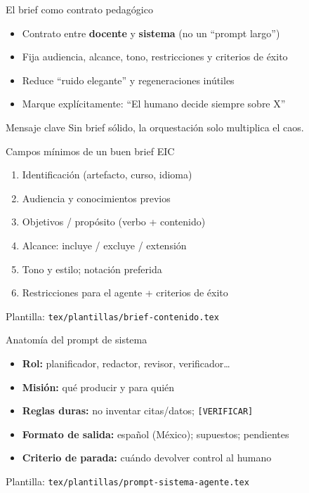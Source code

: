 \documentclass[aspectratio=169,11pt]{beamer}
\begin{document}
\begin{frame}{El brief como contrato pedagógico}
\begin{itemize}
\item Contrato entre \textbf{docente} y \textbf{sistema} (no un ``prompt largo'')
\item Fija audiencia, alcance, tono, restricciones y criterios de éxito
\item Reduce ``ruido elegante'' y regeneraciones inútiles
\item Marque explícitamente: ``El humano decide siempre sobre X''
\end{itemize}
\begin{alertblock}{Mensaje clave}
Sin brief sólido, la orquestación solo multiplica el caos.
\end{alertblock}
\end{frame}

\begin{frame}{Campos mínimos de un buen brief EIC}
\begin{enumerate}
\item Identificación (artefacto, curso, idioma)
\item Audiencia y conocimientos previos
\item Objetivos / propósito (verbo + contenido)
\item Alcance: incluye / excluye / extensión
\item Tono y estilo; notación preferida
\item Restricciones para el agente + criterios de éxito
\end{enumerate}
Plantilla: \texttt{tex/plantillas/brief-contenido.tex}
\end{frame}

\begin{frame}{Anatomía del prompt de sistema}
\begin{itemize}
\item \textbf{Rol:} planificador, redactor, revisor, verificador\ldots
\item \textbf{Misión:} qué producir y para quién
\item \textbf{Reglas duras:} no inventar citas/datos; \texttt{[VERIFICAR]}
\item \textbf{Formato de salida:} español (México); supuestos; pendientes
\item \textbf{Criterio de parada:} cuándo devolver control al humano
\end{itemize}
Plantilla: \texttt{tex/plantillas/prompt-sistema-agente.tex}
\end{frame}
\end{document}
